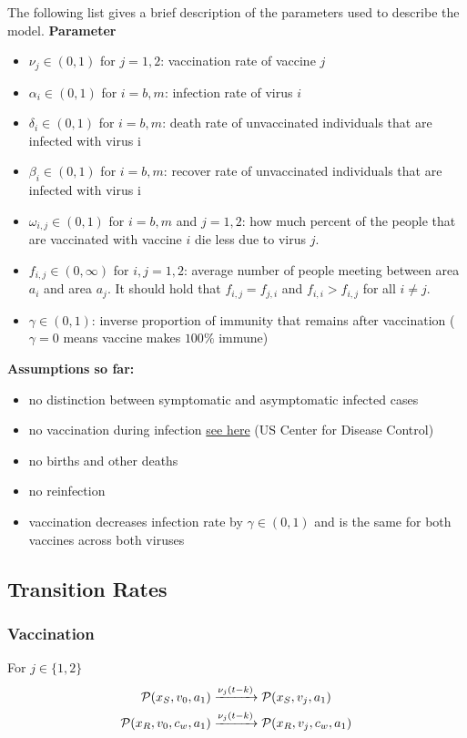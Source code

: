 The following list gives a brief description of the parameters used to describe the model. 
\vspace{0.5cm}
\textbf{Parameter}
\begin{itemize}
    \item $\nu_j \in (0,1)$ for $j=1,2$: vaccination rate of vaccine $j$
    \item $\alpha_i \in (0,1)$ for $i=b,m$: infection rate of virus $i$
    \item $\delta_i \in (0,1)$  for $i=b,m$: death rate of unvaccinated individuals that are infected with virus i
    \item $\beta_i \in (0,1)$ for $i=b,m$: recover rate of unvaccinated individuals that are infected with virus i
    \item $\omega_{i,j} \in (0,1)$ for $i=b,m$ and $j=1,2$: how much percent of the people that are vaccinated with vaccine $i$ die less due to virus $j$. 
    \item $f_{i,j} \in (0,\infty)$ for $i,j=1,2$: average number of people meeting between area $a_i$ and area $a_j$. It should hold that $f_{i,j} = f_{j,i}$ and $f_{i,i} > f_{i,j}$ for all $i \neq j$.
    \item $\gamma \in (0,1)$: inverse proportion of immunity that remains after vaccination ($\gamma =0$ means vaccine makes $100\%$ immune)
\end{itemize}
\vspace{0.5cm}


\textbf{Assumptions so far:} 
\begin{itemize}
    \item no distinction between symptomatic and asymptomatic infected cases
    \item no vaccination during infection \href{https://www.cdc.gov/vaccines/covid-19/info-by-product/clinical-considerations.html}{see here} (US Center for Disease Control)
    \item no births and other deaths
    \item no reinfection
    \item vaccination decreases infection rate by $\gamma \in (0,1)$ and is the same for both vaccines across both viruses
\end{itemize}
\vspace{0.5cm}
\subsection{Transition Rates}

\subsubsection*{Vaccination}
For $j \in \{1,2\}$
\begin{align*}
\mathcal{P}(x_S, v_0, a_1) &\xrightarrow{\nu_j(t-k)} \mathcal{P}(x_S, v_j, a_1) \notag \\
\mathcal{P}(x_R, v_0, c_w, a_1) &\xrightarrow{\nu_j(t-k)} \mathcal{P}(x_R, v_j, c_w, a_1)
\end{align*}

